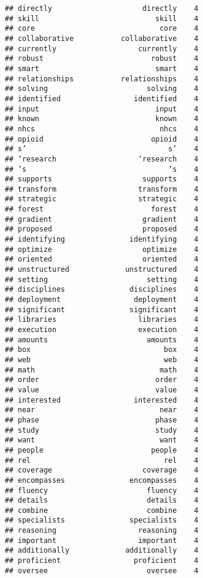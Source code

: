 \documentclass[]{article}
\begin{document}
\begin{verbatim}
## directly                     directly    4
## skill                           skill    4
## core                             core    4
## collaborative           collaborative    4
## currently                   currently    4
## robust                         robust    4
## smart                           smart    4
## relationships           relationships    4
## solving                       solving    4
## identified                 identified    4
## input                           input    4
## known                           known    4
## nhcs                             nhcs    4
## opioid                         opioid    4
## s’                                 s’    4
## ‘research                   ‘research    4
## ’s                                 ’s    4
## supports                     supports    4
## transform                   transform    4
## strategic                   strategic    4
## forest                         forest    4
## gradient                     gradient    4
## proposed                     proposed    4
## identifying               identifying    4
## optimize                     optimize    4
## oriented                     oriented    4
## unstructured             unstructured    4
## setting                       setting    4
## disciplines               disciplines    4
## deployment                 deployment    4
## significant               significant    4
## libraries                   libraries    4
## execution                   execution    4
## amounts                       amounts    4
## box                               box    4
## web                               web    4
## math                             math    4
## order                           order    4
## value                           value    4
## interested                 interested    4
## near                             near    4
## phase                           phase    4
## study                           study    4
## want                             want    4
## people                         people    4
## rel                               rel    4
## coverage                     coverage    4
## encompasses               encompasses    4
## fluency                       fluency    4
## details                       details    4
## combine                       combine    4
## specialists               specialists    4
## reasoning                   reasoning    4
## important                   important    4
## additionally             additionally    4
## proficient                 proficient    4
## oversee                       oversee    4

\end{verbatim}
\end{document}
